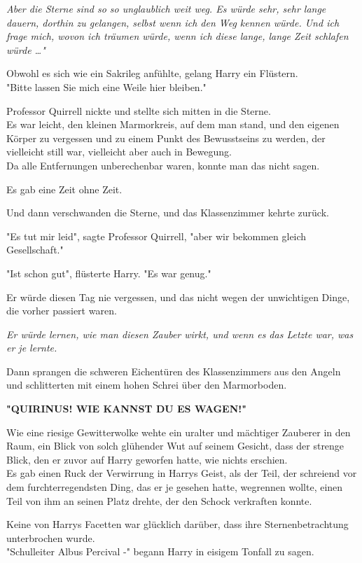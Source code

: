 {\emph{Aber die Sterne sind so so unglaublich weit weg. Es würde sehr, sehr lange dauern, dorthin zu gelangen, selbst wenn ich den Weg kennen würde. Und ich frage mich, wovon ich träumen würde, wenn ich diese lange, lange Zeit schlafen würde …"}

Obwohl es sich wie ein Sakrileg anfühlte, gelang Harry ein Flüstern.\\ "Bitte lassen Sie mich eine Weile hier bleiben."

Professor Quirrell nickte und stellte sich mitten in die Sterne.\\ Es war leicht, den kleinen Marmorkreis, auf dem man stand, und den eigenen Körper zu vergessen und zu einem Punkt des Bewusstseins zu werden, der vielleicht still war, vielleicht aber auch in Bewegung.\\ Da alle Entfernungen unberechenbar waren, konnte man das nicht sagen.

Es gab eine Zeit ohne Zeit.

Und dann verschwanden die Sterne, und das Klassenzimmer kehrte zurück.

"Es tut mir leid", sagte Professor Quirrell, "aber wir bekommen gleich Gesellschaft."

"Ist schon gut", flüsterte Harry. "Es war genug."

Er würde diesen Tag nie vergessen, und das nicht wegen der unwichtigen Dinge, die vorher passiert waren.

\emph{Er würde lernen, wie man diesen Zauber wirkt, und wenn es das Letzte war, was er je lernte.}

Dann sprangen die schweren Eichentüren des Klassenzimmers aus den Angeln und schlitterten mit einem hohen Schrei über den Marmorboden.

\textbf{"QUIRINUS! WIE KANNST DU ES WAGEN!"}

Wie eine riesige Gewitterwolke wehte ein uralter und mächtiger Zauberer in den Raum, ein Blick von solch glühender Wut auf seinem Gesicht, dass der strenge Blick, den er zuvor auf Harry geworfen hatte, wie nichts erschien.\\ Es gab einen Ruck der Verwirrung in Harrys Geist, als der Teil, der schreiend vor dem furchterregendsten Ding, das er je gesehen hatte, wegrennen wollte, einen Teil von ihm an seinen Platz drehte, der den Schock verkraften konnte.

Keine von Harrys Facetten war glücklich darüber, dass ihre Sternenbetrachtung unterbrochen wurde.\\ "Schulleiter Albus Percival -" begann Harry in eisigem Tonfall zu sagen.

}
